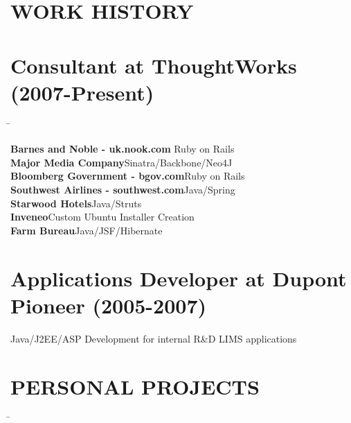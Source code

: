 \documentclass{res}
\begin{document}
 


\address{udit.manektala.com \\  uditmanektala@gmail.com \\  (515) 770-2500}        
                                  
\begin{resume}

\section{WORK HISTORY}          
\section {Consultant at ThoughtWorks (2007-Present)}
   \begin{tabbing}
   \hspace{3.3in}\= \kill %

{\bf Barnes and Noble - uk.nook.com} \>Ruby on Rails \\


{\bf Major Media Company}\>Sinatra/Backbone/Neo4J \\

{\bf Bloomberg Government - bgov.com}\>Ruby on Rails \\

{\bf Southwest Airlines - southwest.com}\>Java/Spring \\

{\bf Starwood Hotels}\>Java/Struts\\

{\bf Inveneo}\>Custom Ubuntu Installer Creation\\

{\bf Farm Bureau}\>Java/JSF/Hibernate \\
 
\section {Applications Developer at Dupont Pioneer (2005-2007)}
Java/J2EE/ASP Development for internal R\&D LIMS applications
\end{tabbing}
\section{PERSONAL PROJECTS}          
   \begin{tabbing}
   \hspace{3.3in}\= \kill %


\end{tabbing}
\end{resume}
\end{document}
